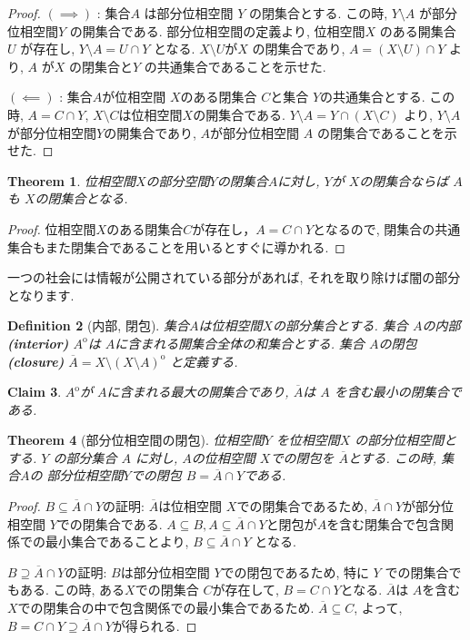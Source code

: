 \documentclass[lualatex]{ltjsbook}
\newcommand{\cl}[1]{\overline{ #1}  }
\newcommand{\Int}[1]{#1 ^{\mathrm{o}} }
\newtheorem{theorem}{Theorem}[section]
\newtheorem{definition}[theorem]{Definition}
\newtheorem{claim}[theorem]{Claim}
\theoremstyle{remark}
\theoremstyle{plain}
\begin{document}
\begin{proof}
	$\left( \implies \right) $ : 集合$A$ は部分位相空間 $Y$ の閉集合とする. 
	この時, $Y\setminus A$ が部分位相空間$Y$ の開集合である.
	部分位相空間の定義より, 位相空間$X$ のある開集合 $U$ が存在し, $Y\setminus A = U \cap Y$ となる. 
	$X\setminus U$が$X$ の閉集合であり, $A = \left( X \setminus U \right) \cap Y$ より, $A$ が$X$ の閉集合と$Y$ の共通集合であることを示せた.
	
	$\left( \impliedby \right) $ : 集合$A$が位相空間 $X$のある閉集合 $C$と集合 $Y$の共通集合とする.
	この時, $A=C\cap Y$,  $X\setminus C$は位相空間$X$の開集合である.
	$Y\setminus A = Y\cap \left( X \setminus C \right) $  より, $Y\setminus A$が部分位相空間$Y$の開集合であり,  $A$が部分位相空間 $A$ の閉集合であることを示せた.
\end{proof}

\begin{theorem}
\label{the:closedset}
	位相空間$X$の部分空間$Y$の閉集合$A$に対し,  $Y$が $X$の閉集合ならば $A$も $X$の閉集合となる.
\end{theorem}

\begin{proof}
	位相空間$X$のある閉集合$C$が存在し，$A = C\cap Y$となるので, 閉集合の共通集合もまた閉集合であることを用いるとすぐに導かれる.
\end{proof}

一つの社会には情報が公開されている部分があれば, それを取り除けば闇の部分となります.

\begin{definition}[内部, 閉包]
	集合$A$は位相空間$X$の部分集合とする. 
	集合 $A$の内部\textbf{(interior)} $\Int{A}$は $A$に含まれる開集合全体の和集合とする. 
	集合 $A$の閉包\textbf{(closure)} $\cl{A}= X \setminus\Int{ \left( X\setminus A \right)}$ と定義する.
\end{definition}

\begin{claim}
	$\Int{A}$が $A$に含まれる最大の開集合であり,  $\cl{A}$は $A$ を含む最小の閉集合である.
\end{claim}

\begin{theorem}[部分位相空間の閉包]
	位相空間$Y$ を位相空間$X$ の部分位相空間とする. 
	$Y$ の部分集合 $A$ に対し, $A$の位相空間 $X$での閉包を $\cl{A}$とする.
	この時, 集合$A$の 部分位相空間$Y$での閉包 $B= \cl{A} \cap Y$である.
\end{theorem}

\begin{proof}
	$B \subseteq \cl{A} \cap Y $の証明:  $\cl{A}$は位相空間 $X$での閉集合であるため,  $\cl{A} \cap Y $が部分位相空間 $Y$での閉集合である.  
	$A \subseteq B, A \subseteq \cl{A} \cap Y$と閉包が$A$を含む閉集合で包含関係での最小集合であることより, $B \subseteq \cl{A} \cap Y$ となる.

	$B \supseteq \cl{A} \cap Y$の証明:  $B$は部分位相空間 $Y$での閉包であるため, 特に $Y$ での閉集合でもある. 
	この時, ある$X$での閉集合 $C$が存在して,  $B=C \cap Y$となる.  
	$\cl{A}$は $A$を含む $X$での閉集合の中で包含関係での最小集合であるため. 
	$\cl{A} \subseteq C$, よって,  $B = C \cap Y \supseteq \cl{A} \cap Y$が得られる.
\end{proof}
\end{document}
